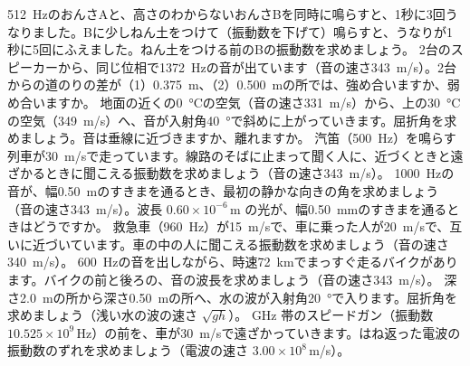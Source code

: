 \bkendproblems
{}
\bkproblem \qty{512}{Hz}のおんさAと、高さのわからないおんさBを同時に鳴らすと、1秒に3回うなりました。Bに少しねん土をつけて（振動数を下げて）鳴らすと、うなりが1秒に5回にふえました。ねん土をつける前のBの振動数を求めましょう。
\bkproblem 2台のスピーカーから、同じ位相で\qty{1372}{Hz}の音が出ています（音の速さ\qty{343}{m/s}）。2台からの道のりの差が（1）\qty{0.375}{m}、（2）\qty{0.500}{m}の所では、強め合いますか、弱め合いますか。
\bkproblem 地面の近くの\qty{0}{\celsius}の空気（音の速さ\qty{331}{m/s}）から、上の\qty{30}{\celsius}の空気（\qty{349}{m/s}）へ、音が入射角\qty{40}{\degree}で斜めに上がっていきます。屈折角を求めましょう。音は垂線に近づきますか、離れますか。
\bkproblem 汽笛（\qty{500}{Hz}）を鳴らす列車が\qty{30}{m/s}で走っています。線路のそばに止まって聞く人に、近づくときと遠ざかるときに聞こえる振動数を求めましょう（音の速さ\qty{343}{m/s}）。
\bkproblem \qty{1000}{Hz}の音が、幅\qty{0.50}{m}のすきまを通るとき、最初の静かな向きの角を求めましょう（音の速さ\qty{343}{m/s}）。波長 $0.60\times10^{-6}$\,m の光が、幅\qty{0.50}{mm}のすきまを通るときはどうですか。
\bkproblem 救急車（\qty{960}{Hz}）が\qty{15}{m/s}で、車に乗った人が\qty{20}{m/s}で、互いに近づいています。車の中の人に聞こえる振動数を求めましょう（音の速さ\qty{340}{m/s}）。
\bkproblem \qty{600}{Hz}の音を出しながら、時速\qty{72}{km}でまっすぐ走るバイクがあります。バイクの前と後ろの、音の波長を求めましょう（音の速さ\qty{343}{m/s}）。
\bkproblem 深さ\qty{2.0}{m}の所から深さ\qty{0.50}{m}の所へ、水の波が入射角\qty{20}{\degree}で入ります。屈折角を求めましょう（浅い水の波の速さ $\sqrt{gh}$）。
 GHz 帯のスピードガン（振動数 $10.525\times10^9$\,Hz）の前を、車が\qty{30}{m/s}で遠ざかっていきます。はね返った電波の振動数のずれを求めましょう（電波の速さ $3.00\times10^8$\,m/s）。
